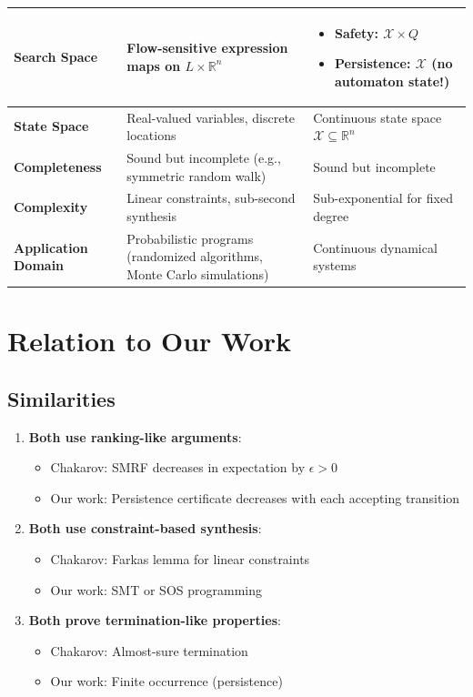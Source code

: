 \documentclass{article}
\begin{document}
\begin{center}
\begin{tabular}{|p{3.5cm}|p{5.5cm}|p{5.5cm}|}
\hline
\textbf{Search Space} & Flow-sensitive expression maps on $L \times \mathbb{R}^n$ &
\begin{itemize}
\item Safety: $\mathcal{X} \times Q$
\item Persistence: $\mathcal{X}$ (no automaton state!)
\end{itemize} \\
\hline
\textbf{State Space} & Real-valued variables, discrete locations & Continuous state space $\mathcal{X} \subseteq \mathbb{R}^n$ \\
\hline
\textbf{Completeness} & Sound but incomplete (e.g., symmetric random walk) & Sound but incomplete \\
\hline
\textbf{Complexity} & Linear constraints, sub-second synthesis & Sub-exponential for fixed degree \\
\hline
\textbf{Application Domain} & Probabilistic programs (randomized algorithms, Monte Carlo simulations) & Continuous dynamical systems \\
\hline
\end{tabular}
\end{center}

\section{Relation to Our Work}

\subsection{Similarities}

\begin{enumerate}
    \item \textbf{Both use ranking-like arguments}:
    \begin{itemize}
        \item Chakarov: SMRF decreases in expectation by $\epsilon > 0$
        \item Our work: Persistence certificate decreases with each accepting transition
    \end{itemize}

    \item \textbf{Both use constraint-based synthesis}:
    \begin{itemize}
        \item Chakarov: Farkas lemma for linear constraints
        \item Our work: SMT or SOS programming
    \end{itemize}

    \item \textbf{Both prove termination-like properties}:
    \begin{itemize}
        \item Chakarov: Almost-sure termination
        \item Our work: Finite occurrence (persistence)
    \end{itemize}
\end{enumerate}
\end{document}
